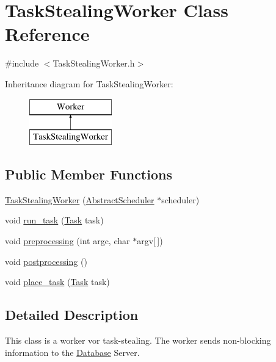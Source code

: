 \hypertarget{class_task_stealing_worker}{}\section{Task\+Stealing\+Worker Class Reference}
\label{class_task_stealing_worker}


{\ttfamily \#include $<$Task\+Stealing\+Worker.\+h$>$}

Inheritance diagram for Task\+Stealing\+Worker\+:\begin{figure}[H]
\begin{center}
\leavevmode
\includegraphics[height=2.000000cm]{class_task_stealing_worker}
\end{center}
\end{figure}
\subsection*{Public Member Functions}
\begin{DoxyCompactItemize}
\item 
\hyperlink{class_task_stealing_worker_a51b370c7dd7e811fd4f0bf1bb35c6504}{Task\+Stealing\+Worker} (\hyperlink{class_abstract_scheduler}{Abstract\+Scheduler} $\ast$scheduler)
\item 
void \hyperlink{class_task_stealing_worker_aa3dd8530803573c2029dcf2c32d4d5ae}{run\+\_\+task} (\hyperlink{_types_8h_a0c77930ab3818a1680c59353f627fba8}{Task} task)
\item 
void \hyperlink{class_task_stealing_worker_a4bdc52bab41bf39d44191b419e879d4b}{preprocessing} (int argc, char $\ast$argv\mbox{[}$\,$\mbox{]})
\item 
void \hyperlink{class_task_stealing_worker_ac0d27069ce08e1a7da4ff9245091adf4}{postprocessing} ()
\item 
void \hyperlink{class_task_stealing_worker_afce5be5da1c09d4dce30d16fa12a896f}{place\+\_\+task} (\hyperlink{_types_8h_a0c77930ab3818a1680c59353f627fba8}{Task} task)
\end{DoxyCompactItemize}


\subsection{Detailed Description}
This class is a worker vor task-\/stealing. The worker sends non-\/blocking information to the \hyperlink{class_database}{Database} Server.

